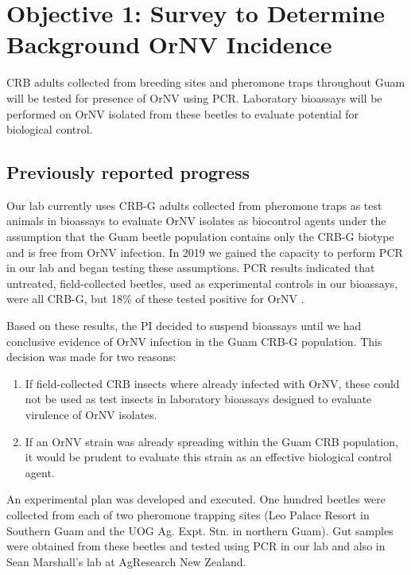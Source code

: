 \documentclass[12pt,letterpaper,english,bibliography=totocnumbered, abstract=on]{scrartcl}
\begin{document}
\section{Objective 1: Survey to Determine Background OrNV Incidence} 

\begin{framed}
CRB adults collected from breeding sites and pheromone traps throughout Guam will be tested for presence of OrNV using PCR.  Laboratory bioassays will be performed on OrNV isolated from these beetles to evaluate potential for biological control.
\end{framed} 

\subsection{Previously reported progress}

Our lab currently uses CRB-G adults collected from pheromone traps as test animals in bioassays to evaluate OrNV isolates as biocontrol agents under the assumption that the Guam beetle population contains only the CRB-G biotype and is free from OrNV infection. In 2019 we gained the capacity to perform PCR in our lab and began testing these assumptions. PCR results indicated that untreated, field-collected beetles, used as experimental controls in our bioassays, were all CRB-G, but 18\% of these tested positive for OrNV \cite{graselaTechnicalReportPolymerase2020, graselaTechnicalReportPolymerase2020a}.

Based on these results, the PI decided to suspend bioassays until we had conclusive evidence of OrNV infection in the Guam CRB-G population.  This decision was made for two reasons:

\begin{enumerate}
	\item If field-collected CRB insects where already infected with OrNV, these could not be used as test insects in laboratory bioassays designed to evaluate virulence of OrNV isolates.
	\item If an OrNV strain was already spreading within the Guam CRB population, it would be prudent to evaluate this strain as an effective biological control agent. 
\end{enumerate}

An experimental plan \cite{mooreExperimentalPlanDetermining2020} was developed and executed. One hundred beetles were collected from each of two pheromone trapping sites (Leo Palace Resort in Southern Guam and the UOG Ag. Expt. Stn. in northern Guam). Gut samples were obtained from these beetles and tested using PCR in our lab and also in Sean Marshall's lab at AgResearch New Zealand. 
\end{document}
